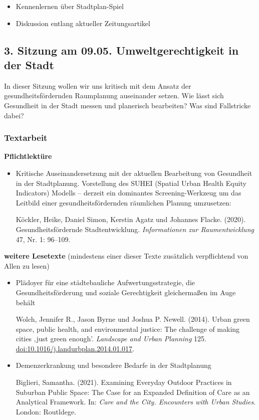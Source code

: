 \documentclass[
  ngerman,
]{article}
\providecommand{\tightlist}{%
  \setlength{\itemsep}{0pt}\setlength{\parskip}{0pt}}
\begin{document}
\begin{itemize}
\tightlist
\item
  Kennenlernen über Stadtplan-Spiel
\item
  Diskussion entlang aktueller Zeitungsartikel
\end{itemize}

\hypertarget{sitzung-am-09.05.-umweltgerechtigkeit-in-der-stadt}{%
\subsection*{3. Sitzung am 09.05. \textbar{} Umweltgerechtigkeit in der Stadt}\label{sitzung-am-09.05.-umweltgerechtigkeit-in-der-stadt}}

In dieser Sitzung wollen wir uns kritisch mit dem Ansatz der gesundheitsfördernden Raumplanung auseinander setzen. Wie lässt sich Gesundheit in der Stadt messen und planerisch bearbeiten? Was sind Fallstricke dabei?

\hypertarget{textarbeit-2}{%
\subsubsection*{Textarbeit}\label{textarbeit-2}}

\textbf{Pflichtlektüre}

\begin{itemize}
\item
  Kritische Auseinandersetzung mit der aktuellen Bearbeitung von Gesundheit in der Stadtplanung. Vorstellung des SUHEI (Spatial Urban Health Equity Indicators) Modells -- derzeit ein dominantes Screening-Werkzeug um das Leitbild einer gesundheitsfördernden räumlichen Planung umzusetzen:

  Köckler, Heike, Daniel Simon, Kerstin Agatz und Johannes Flacke. (2020). Gesundheitsfördernde Stadtentwicklung. \emph{Informationen zur Raumentwicklung} 47, Nr. 1: 96--109.
\end{itemize}

\textbf{weitere Lesetexte}
(mindestens einer dieser Texte zusätzlich verpflichtend von Allen zu lesen)

\begin{itemize}
\item
  Plädoyer für eine städtebauliche Aufwertungsstrategie, die Gesundheitsförderung und soziale Gerechtigkeit gleichermaßen im Auge behält

  Wolch, Jennifer R., Jason Byrne und Joshua P. Newell. (2014). Urban green space, public health, and environmental justice: The challenge of making cities ‚just green enough'. \emph{Landscape and Urban Planning} 125. \url{doi:10.1016/j.landurbplan.2014.01.017}.
\item
  Demenzerkrankung und besondere Bedarfe in der Stadtplanung

  Biglieri, Samantha. (2021). Examining Everyday Outdoor Practices in Suburban Public Space: The Case for an Expanded Definition of Care as an Analytical Framework. In: \emph{Care and the City. Encounters with Urban Studies}. London: Routldege.
\end{itemize}
\end{document}
